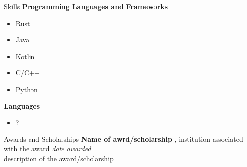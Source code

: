 	\begin{rSection}{Skills}
		{\bf Programming Languages and Frameworks }
		\begin{itemize}
			\item Rust
			\item Java
			\item Kotlin
			\item C/C++
			\item Python
		\end{itemize}
		{\bf Languages}
		\begin{itemize}
			\item ?
		\end{itemize}
	\end{rSection}

	\begin{rSection}{Awards and Scholarships} 
		{\bf Name of awrd/scholarship}{ , institution associated with the award
		} \hfill{\em date awarded}
		\\description of the award/scholarship\\

	\end{rSection}




